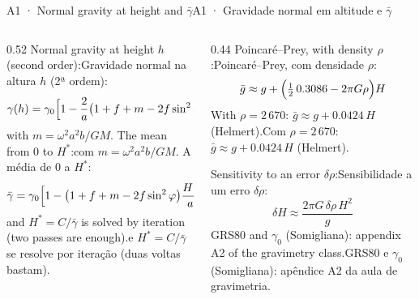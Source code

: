 \documentclass[aspectratio=169,11pt]{beamer}
\newcommand{\tr}[2]{\ifEN#2\else#1\fi}
\begin{document}
\begin{frame}{\tr{A1 · Gravidade normal em altitude e $\bar\gamma$}{A1 · Normal gravity at
  height and $\bar\gamma$}}
  \small
  \begin{columns}[T]
    \begin{column}{0.52\textwidth}
      \tr{Gravidade normal na altura $h$ (2ª ordem):}{Normal gravity at height $h$ (second
      order):}
      \[ \gamma(h) = \gamma_0\Bigl[1 - \frac{2}{a}\bigl(1 + f + m - 2f\sin^2\varphi\bigr)h +
         \frac{3h^2}{a^2}\Bigr] \]
      \tr{com $m = \omega^2 a^2 b / GM$. A média de $0$ a $H^{*}$:}{with $m = \omega^2 a^2 b /
      GM$. The mean from $0$ to $H^{*}$:}
      \[ \bar\gamma = \gamma_0\Bigl[1 - \bigl(1 + f + m - 2f\sin^2\varphi\bigr)\frac{H^{*}}{a}
         + \frac{H^{*2}}{a^2}\Bigr] \]
      \tr{e $H^{*} = C/\bar\gamma$ se resolve por iteração (duas voltas bastam).}{and $H^{*} =
      C/\bar\gamma$ is solved by iteration (two passes are enough).}
    \end{column}
    \begin{column}{0.44\textwidth}
      \tr{Poincaré--Prey, com densidade $\rho$:}{Poincaré--Prey, with density $\rho$:}
      \[ \bar g \approx g + \Bigl(\tfrac{1}{2}\,\num{0.3086} - 2\pi G\rho\Bigr) H \]
      \tr{Com $\rho = 2\,670$: $\bar g \approx g + \num{0.0424}\,H$ (Helmert).}{With $\rho =
      2\,670$: $\bar g \approx g + \num{0.0424}\,H$ (Helmert).}
      \medskip

      \tr{Sensibilidade a um erro $\delta\rho$:}{Sensitivity to an error $\delta\rho$:}
      \[ \delta H \approx \frac{2\pi G\,\delta\rho\,H^2}{g} \]
      {\scriptsize\tr{GRS80 e $\gamma_0$ (Somigliana): apêndice A2 da aula de
      gravimetria.}{GRS80 and $\gamma_0$ (Somigliana): appendix A2 of the gravimetry class.}}
    \end{column}
  \end{columns}
\end{frame}
\end{document}
